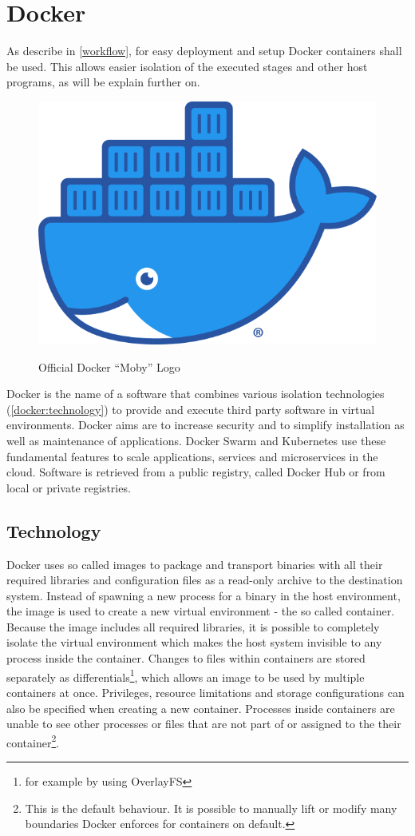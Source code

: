 \section{Docker}
\label{docker:image}

As describe in \autoref{workflow}, for easy deployment and setup Docker\cite{docker:main} containers shall be used.
This allows easier isolation of the executed stages and other host programs, as will be explain further on.

\begin{figure}
	\centering
	\includegraphics[width=.2\textwidth]{res/docker-Moby-logo.png}
	\label{docker:logo}
	\caption{Official Docker \enquote{Moby} Logo\cite{docker:logo}}
	\vspace{1cm}
\end{figure}

Docker is the name of a software that combines various isolation technologies (\autoref{docker:technology}) to provide and execute third party software in virtual environments.
Docker aims are to increase security and to simplify installation as well as maintenance of applications.
Docker Swarm\cite{docker:swarm:key-concepts} and Kubernetes\cite{kubernetes:overview} use these fundamental features to scale applications, services and microservices in the cloud.
Software is retrieved from a public registry, called Docker Hub\cite{docker:hub} or from local or private registries.


\subsection{Technology}
\label{docker:technology}

Docker uses so called images to package and transport binaries with all their required libraries and configuration files as a read-only archive to the destination system.
Instead of spawning a new process for a binary in the host environment, the image is used to create a new virtual environment - the so called container.
Because the image includes all required libraries, it is possible to completely isolate the virtual environment which makes the host system invisible to any process inside the container.
Changes to files within containers are stored separately as differentials\footnote{for example by using OverlayFS\cite{overlayfs}}, which allows an image to be used by multiple containers at once.
Privileges, resource limitations and storage configurations can also be specified when creating a new container.
Processes inside containers are unable to see  other processes or files that are not part of or assigned to the their container\footnote{This is the default behaviour. It is possible to manually lift or modify many boundaries Docker enforces for containers on default.}.

